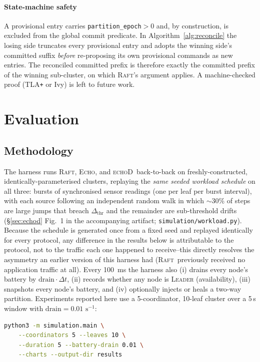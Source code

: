 \documentclass[conference]{IEEEtran}
\newcommand{\echoproto}{\textsc{Echo}\xspace}
\newcommand{\raftproto}{\textsc{Raft}\xspace}
\newcommand{\echodproto}{\textsc{echoD}\xspace}
\begin{document}
\paragraph{State-machine safety}
A provisional entry carries
\texttt{partition\_epoch}$>0$ and, by construction, is excluded from
the global commit predicate. In Algorithm~\ref{alg:reconcile} the
losing side truncates every provisional entry and adopts the winning
side's committed suffix \emph{before} re-proposing its own provisional
commands as new entries. The reconciled committed prefix is therefore
exactly the committed prefix of the winning sub-cluster, on which
\raftproto's argument applies. A machine-checked proof (TLA\texttt{+}
or Ivy) is left to future work.

\section{Evaluation}\label{sec:eval}

\subsection{Methodology}
The harness runs \raftproto, \echoproto, and \echodproto\ back-to-back
on freshly-constructed, identically-parameterised clusters, replaying
the \emph{same seeded workload schedule} on all three: bursts of
synchronised sensor readings (one per leaf per burst interval), with
each source following an independent random walk in which
$\sim$30\% of steps are large jumps that breach $\Delta_{\text{thr}}$
and the remainder are sub-threshold drifts (\S\ref{sec:echod}
Fig.~1 in the accompanying artifact; \texttt{simulation/workload.py}).
Because the schedule is generated once from a fixed seed and replayed
identically for every protocol, any difference in the results below is
attributable to the protocol, not to the traffic each one happened to
receive--this directly resolves the asymmetry an earlier version of
this harness had (\raftproto\ previously received no application
traffic at all). Every 100~ms the harness also (i) drains every node's
battery by $\text{drain}\cdot\Delta t$, (ii) records whether any node is
\textsc{Leader} (availability), (iii) snapshots every node's battery,
and (iv) optionally injects or heals a two-way partition. Experiments
reported here use a 5-coordinator, 10-leaf cluster over a 5\,s window
with $\text{drain}=0.01\text{ s}^{-1}$:
\begin{lstlisting}[language=bash]
python3 -m simulation.main \
    --coordinators 5 --leaves 10 \
    --duration 5 --battery-drain 0.01 \
    --charts --output-dir results
\end{lstlisting}
\end{document}
